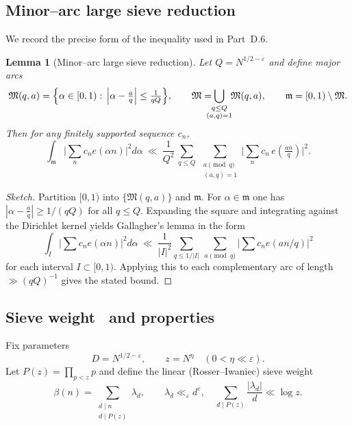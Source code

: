 \documentclass[11pt]{article}
\newtheorem{lemma}{Lemma}[part]
\theoremstyle{definition}
\theoremstyle{remark}
\numberwithin{equation}{part}
\begin{document}
\subsection{Minor--arc large sieve reduction}

We record the precise form of the inequality used in Part~D.6.

\begin{lemma}[Minor--arc large sieve reduction]\label{lem:largesieve-minor}
	Let $Q=N^{1/2-\varepsilon}$ and define major arcs
	\[
		\mathfrak M(q,a)=\Bigl\{\alpha\in[0,1):\,\Big|\alpha-\tfrac{a}{q}\Big|\le \tfrac{1}{qQ}\Bigr\},
		\qquad \mathfrak M=\!\!\!\!\!\bigcup_{\substack{q\le Q\\ (a,q)=1}}\!\!\mathfrak M(q,a),
		\qquad \mathfrak m=[0,1)\setminus\mathfrak M.
	\]
	Then for any finitely supported sequence $c_n$,
	\[
		\int_{\mathfrak m}\Big|\sum_{n}c_n e(\alpha n)\Big|^2 d\alpha
		\ \ll\ \frac{1}{Q^2}\,
		\sum_{q\le Q}\ \sum_{\substack{a\!\!\!\pmod q\\ (a,q)=1}}
		\Big|\sum_{n} c_n\,e\!\left(\tfrac{an}{q}\right)\Big|^2.
	\]
\end{lemma}

\begin{proof}[Sketch]
	Partition $[0,1)$ into $\{\mathfrak M(q,a)\}$ and $\mathfrak m$. For $\alpha\in\mathfrak m$ one has
	$|\alpha-\tfrac aq|\ge 1/(qQ)$ for all $q\le Q$. Expanding the square and integrating against the Dirichlet kernel yields Gallagher’s lemma in the form
	\[
		\int_{I} \Big|\sum c_n e(\alpha n)\Big|^2 d\alpha
		\ \ll\ \frac{1}{|I|^2}\sum_{q\le 1/|I|}\ \sum_{a\pmod q}\Big|\sum c_n e(an/q)\Big|^2
	\]
	for each interval $I\subset[0,1)$. Applying this to each complementary arc of length $\gg (qQ)^{-1}$ gives the stated bound.
\end{proof}

\subsection{Sieve weight \textbeta\ and properties}

Fix parameters
\[
	D=N^{1/2-\varepsilon},\qquad z=N^{\eta}\quad(0<\eta\ll \varepsilon).
\]
Let $P(z)=\prod_{p<z}p$ and define the linear (Rosser--Iwaniec) sieve weight
\[
	\beta(n)=\sum_{\substack{d\mid n\\ d\mid P(z)}} \lambda_d,\qquad
	\lambda_d\ll_\varepsilon d^{\varepsilon},\quad
	\sum_{d\mid P(z)}\frac{|\lambda_d|}{d}\ll \log z.
\]
\end{document}
